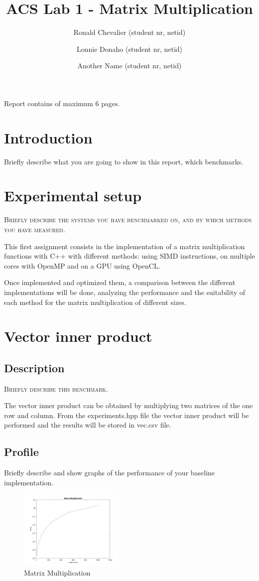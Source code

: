 \documentclass[twocolumn]{article}
\title{\large{\textbf{ACS Lab 1 - Matrix Multiplication}}}
\author{
    \small Ronald Chevalier (student nr, netid)
    \and \small Lonnie Donaho (student nr, netid)
    \and \small Another Name (student nr, netid)
}
\date{}
\begin{document}
\maketitle

\begin{center}
    \footnotesize{Report contains \pageref{LastPage} of maximum 6 pages.}
\end{center}

\section{Introduction}
Briefly describe what you are going to show in this report, which benchmarks.

\section{Experimental setup}
\textsc{Briefly describe the systems you have benchmarked on, and by which methods you have measured.}


This first assignment consists in the implementation of a matrix multiplication functions with C++ with different methods: using SIMD instructions, on multiple cores with OpenMP and on a GPU using OpenCL.

Once implemented  and  optimized them, a comparison between the different implementations  will be done, analyzing the performance  and the suitability of each method for the  matrix multiplication of  different sizes.


\section{Vector inner product}
\subsection{Description}
\textsc{Briefly describe this benchmark.}

The vector inner product can be obtained by multiplying two matrices of the one row and column.
From the experiments.hpp file the vector inner product will be performed and the results will be stored in vec.csv file.

\subsection{Profile}
Briefly describe and show graphs of the performance of your baseline implementation.
\begin{figure}[h]
    \centering
    \includegraphics[width=0.45\textwidth]{matrix_mult.jpg}
    \caption{Matrix Multiplication}
    \label{fig:OpenMP_base}
\end{figure}
\end{document}
